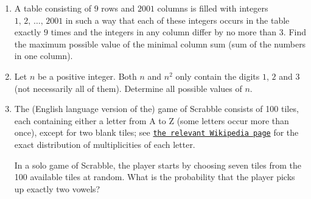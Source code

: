 \documentclass[a4paper,12pt,titlepage]{article}
\begin{document}
\begin{enumerate}[1.]
\item %
A table consisting of $9$ rows and $2001$ columns is filled with integers $1,\,2,\,\ldots,\,2001$ in such a way that each of these integers occurs in the table exactly $9$ times and the integers in any column differ by no more than $3$. Find the maximum possible value of the minimal column sum (sum of the numbers in one column).










\item %
Let $n$ be a positive integer. Both $n$ and $n^2$ only contain the digits $1$, $2$ and $3$ (not necessarily all of them). Determine all possible values of $n$.




\item %
The (English language version of the) game of Scrabble\texttrademark{} consists of 100 tiles, each containing either a letter from A to Z (some letters occur more than once), except for two blank tiles; see \href{https://en.wikipedia.org/wiki/Scrabble_letter_distributions#English}{\texttt{the relevant Wikipedia page}} for the exact distribution of multiplicities of each letter.

In a solo game of Scrabble, the player starts by choosing seven tiles from the 100 available tiles at random. What is the probability that the player picks up exactly two vowels?


\end{enumerate}
\end{document}
